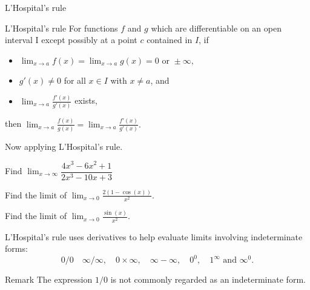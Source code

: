 \begin{frame}{L'Hospital's rule}
\begin{mybox}{L'Hospital's rule}
For functions $f$ and $g$ which are differentiable on an open interval I except possibly at a point $c$ contained in $I$, if

\begin{itemize}
	\item ${\displaystyle \lim _{x\to a}f(x)=\lim _{x\to a}g(x)=0{\text{ or }}\pm \infty ,}  $
	\item $  {\displaystyle g'(x)\neq 0}$ for all $x\in I$  with $x\neq  a$, and
	\item $  \displaystyle  \lim _{x\to a}{\frac {f'(x)}{g'(x)} } $
	exists,
\end{itemize}
then \qquad
$ \displaystyle \lim _{x\to a}{\frac {f(x)}{g(x)}}=\lim _{x\to a}{\frac {f'(x)}{g'(x)}}.$
\end{mybox}
\end{frame}

\begin{frame}
Now applying  L'Hospital's rule.

\begin{myexample}{}{}
Find $\lim_{x\rightarrow \infty} \dfrac{4x^3-6x^2+1}{2x^3 -10x +3}$
\end{myexample}


\end{frame}

\begin{frame}
\begin{myexample}{}{}
Find the limit of   $\displaystyle \lim_{x \to 0} \frac{2(1-\cos(x))}{x^2}$.
\end{myexample}



\end{frame}


\begin{frame}
\begin{myexample}{}{}
	Find the limit of   $\displaystyle \lim_{x \to 0} \frac{\sin(x)}{x^2}$.
\end{myexample}
\end{frame}

\begin{frame}

L'Hospital's rule  uses derivatives to help evaluate limits involving indeterminate forms:
\[0/0 \quad \infty/\infty,  \quad  0\times \infty, \quad
\infty- \infty, \quad 0^0,\quad 1^\infty \text{ and } \infty^0.\]


\begin{mybox}{Remark}{}
	The expression $1/0$ is not commonly regarded as an indeterminate form.
\end{mybox}

\end{frame}

